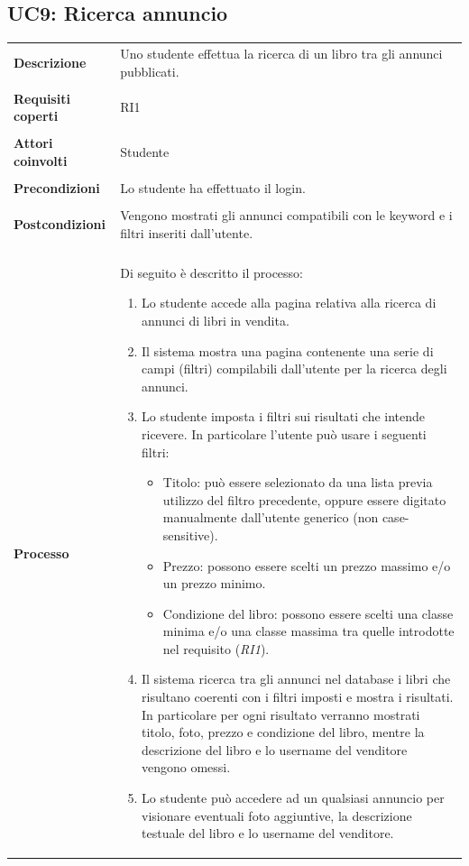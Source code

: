 \documentclass[10pt,a4paper]{report}
\begin{document}
	\subsection{UC9: Ricerca annuncio}
	\begin{tabular}{lp{}}
		\textbf{Descrizione}&Uno studente effettua la ricerca di un libro tra gli annunci pubblicati.\\
		\\
		\textbf{Requisiti coperti}&RI1\\
		\\
		\textbf{Attori coinvolti}&Studente\\
		\\
		\textbf{Precondizioni}&Lo studente ha effettuato il login.\\
		\\
		\textbf{Postcondizioni}&Vengono mostrati gli annunci compatibili con le keyword e i filtri inseriti dall'utente.\\
		\\
		\textbf{Processo}&Di seguito è descritto il processo:
		\begin{enumerate}
			\item Lo studente accede alla pagina relativa alla ricerca di annunci di libri in vendita.
			\item Il sistema mostra una pagina contenente una serie di campi (filtri) compilabili dall'utente per la ricerca degli annunci.
			\item Lo studente imposta i filtri sui risultati che intende ricevere. In particolare l'utente può usare i seguenti filtri:
			\begin{itemize}
				\item Titolo: può essere selezionato da una lista previa utilizzo del filtro precedente, oppure essere digitato manualmente dall'utente generico (non case-sensitive).
				\item Prezzo: possono essere scelti un prezzo massimo e/o un prezzo minimo.
				\item Condizione del libro: possono essere scelti una classe minima e/o una classe massima tra quelle introdotte nel requisito (\textit{RI1}).			
			\end{itemize}
			\item Il sistema ricerca tra gli annunci nel database i libri che risultano coerenti con i filtri imposti e mostra i risultati. In particolare per ogni risultato verranno mostrati titolo, foto, prezzo e condizione del libro, mentre la descrizione del libro e lo username del venditore vengono omessi.
			\item Lo studente può accedere ad un qualsiasi annuncio per visionare eventuali foto aggiuntive, la descrizione testuale del libro e lo username del venditore.
		\end{enumerate}
	\end{tabular}
	
\end{document}
